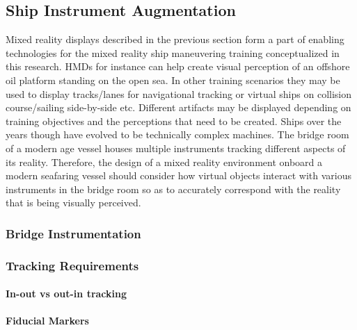 \subsection{Ship Instrument Augmentation}

Mixed reality displays described in the previous section form a part of enabling technologies for the mixed reality ship maneuvering training conceptualized in this research. HMDs for instance can help create visual perception of an offshore oil platform standing on the open sea. In other training scenarios they may be used to display tracks/lanes for navigational tracking or virtual ships on collision course/sailing side-by-side etc. Different artifacts may be displayed depending on training objectives and the perceptions that need to be created. Ships over the years though have evolved to be technically complex machines. The bridge room of a modern age vessel houses multiple instruments tracking different aspects of its reality. Therefore, the design of a mixed reality environment onboard a modern seafaring vessel should consider how virtual objects interact with various instruments in the bridge room so as to accurately correspond with the reality that is being visually perceived.  

\subsubsection{Bridge Instrumentation}

\subsubsection{Tracking Requirements}

\paragraph{In-out vs out-in tracking}

\paragraph{Fiducial Markers}
